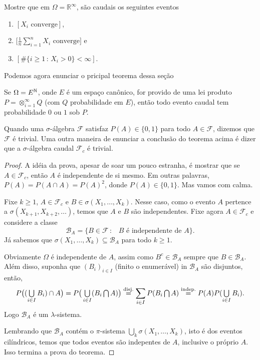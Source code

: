 \begin{exercise}
  Mostre que em $\Omega = \mathbb{R}^{\infty}$, são caudais os seguintes eventos
  \begin{enumerate}[\quad a)]
  \item $[X_i \text{ converge}]$,
  \item $\big[\tfrac{1}{n} \sum_{i=1}^n X_i \text{ converge}\big]$ e
  \item $[\#\{i \geq 1\, : \, X_i > 0\} < \infty]$.
  \end{enumerate}
\end{exercise}

Podemos agora enunciar o pricipal teorema dessa seção

\begin{theorem}
  Se $\Omega = E^{{\mathbb N}}$, onde $E$ é um espaço canônico, for provido de uma lei produto $P = \otimes_{i=1}^\infty Q$ (com $Q$ probabilidade em $E$), então todo evento caudal tem probabilidade $0$ ou $1$ sob $P$.
\end{theorem}

Quando uma $\sigma$-álgebra $\mathcal{F}$ satisfaz $P(A) \in \{0,1\}$ para todo $A \in \mathcal{F}$, dizemos que $\mathcal{F}$ é trivial. 
Uma outra maneira de enunciar a conclusão do teorema acima é dizer que a $\sigma$-álgebra caudal $\mathcal{F}_c$ é trivial.

\begin{proof}
  A idéia da prova, apesar de soar um pouco estranha, é mostrar que se $A \in \mathcal{F}_c$, então $A$ é independente de si mesmo.
  Em outras palavras, $P(A) = P(A \cap A) = P(A)^2$, donde $P(A) \in \{0,1\}$.
  Mas vamos com calma.

  Fixe $k \geq 1$, $A \in \mathcal{F}_c$ e $B \in \sigma(X_1, \dots, X_k)$.
  Nesse caso, como o evento $A$ pertence a $\sigma(X_{k+1}, X_{k+2}, \dots)$, temos que $A$ e $B$ são independentes.
  Fixe agora $A \in \mathcal{F}_c$ e considere a classe
  \begin{equation}
    \mathcal{B}_A = \{B \in \mathcal{F}\, : \, \text{ $B$ é independente de $A$}\}.
  \end{equation}
  Já sabemos que $\sigma(X_1, \dots, X_k) \subseteq \mathcal{B}_A$ para todo $k \geq 1$.

  Obviamente $\Omega$ é independente de $A$, assim como $B^c \in \mathcal{B}_A$ sempre que $B \in \mathcal{B}_A$.
  Além disso, suponha que $(B_i)_{i\in I}$ (finito o enumerável) in $\mathcal{B}_A$ são disjuntos, então,
  \begin{equation*}
    P\big( (\operatorname*{{\textstyle \bigcup}}_{i\in I} B_i) \cap A \big) = P\big( \operatorname*{{\textstyle \bigcup}}_{i\in I} (B_i \operatorname*{{\textstyle \bigcap}} A) \big) \overset{\text{disj.}}= \sum_{i\in I} P(B_i \operatorname*{{\textstyle \bigcap}} A) \overset{\text{indep.}}
    = P(A) P(\operatorname*{{\textstyle \bigcup}}_{i\in I} B_i).
  \end{equation*}
  Logo $\mathcal{B}_A$ é um $\lambda$-sistema.

  Lembrando que $\mathcal{B}_A$ contém o $\pi$-sistema $\bigcup_k \sigma(X_1, \dots, X_k)$, isto é dos eventos cilíndricos, temos que todos eventos são indepentes de $A$, inclusive o próprio $A$.
  Isso termina a prova do teorema.
\end{proof}

